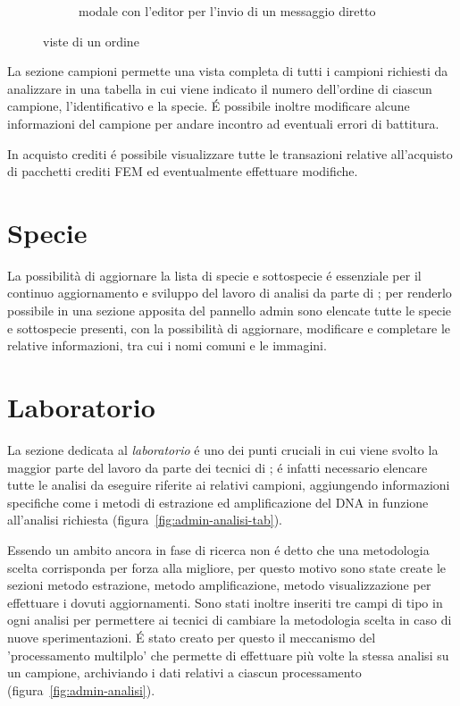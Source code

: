 \begin{figure}
\begin{subfigure}[b]{0.4\textwidth}
   \caption{modale con l'editor per l'invio di un messaggio diretto}
   \label{fig:admin-ordine-mess}
 \end{subfigure}
 \caption{viste di un ordine}
 \label{fig:admin-ordine}
\end{figure}

La sezione \textsf{campioni} permette una vista completa di tutti i campioni richiesti da analizzare in una tabella in cui viene indicato il numero dell'ordine di ciascun campione, l'identificativo e la specie. É possibile inoltre modificare alcune informazioni del campione per andare incontro ad eventuali errori di battitura.

In \textsf{acquisto crediti} é possibile visualizzare tutte le transazioni relative all'acquisto di pacchetti crediti FEM ed eventualmente effettuare modifiche.

\section*{Specie}
La possibilità di aggiornare la lista di \textsf{specie} e \textsf{sottospecie} é essenziale per il continuo aggiornamento e sviluppo del lavoro di analisi da parte di {\fem}; per renderlo possibile in una sezione apposita del pannello admin sono elencate tutte le specie e sottospecie presenti, con la possibilità di aggiornare, modificare e completare le relative informazioni, tra cui i nomi comuni e le immagini.

\section*{Laboratorio}
La sezione dedicata al \emph{laboratorio} é uno dei punti cruciali in cui viene svolto la maggior parte del lavoro da parte dei tecnici di {\fem}; é infatti necessario elencare tutte le analisi da eseguire riferite ai relativi campioni, aggiungendo informazioni specifiche come i metodi di estrazione ed amplificazione del DNA in funzione all'analisi richiesta (figura~\ref{fig:admin-analisi-tab}). 

Essendo un ambito ancora in fase di ricerca non é detto che una metodologia scelta corrisponda per forza alla migliore, per questo motivo sono state create le sezioni \textsf{metodo estrazione}, \textsf{metodo amplificazione}, \textsf{metodo visualizzazione} per effettuare i dovuti aggiornamenti. Sono stati inoltre inseriti tre campi di tipo  in ogni analisi per permettere ai tecnici di cambiare la metodologia scelta in caso di nuove sperimentazioni. É stato creato per questo il meccanismo del 'processamento multilplo' che permette di effettuare più volte la stessa analisi su un campione, archiviando i dati relativi a ciascun processamento (figura~\ref{fig:admin-analisi}). 

